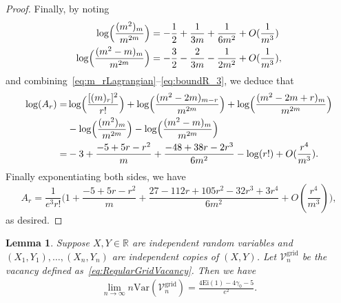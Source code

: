 \documentclass[11pt]{article}
\newtheorem{lemma}[thm]{Lemma}
\begin{document}
\begin{proof}
Finally, by noting 
\begin{align*}
\log\Bigl(\frac{(m^2)_m}{m^{2m}}\Bigr) & = -\frac{1}{2} + \frac{1}{3m} + \frac{1}{6m^2} + O(\frac{1}{m^3})\\ 
\log \Bigl(\frac{(m^2 -m)_{m}}{m^{2m}}\Bigr) &= -\frac{3}{2} - \frac{2}{3m} - \frac{1}{2m^2} + O(\frac{1}{m^3}),
\end{align*}
and combining~\eqref{eq:m_rLagrangian}--\eqref{eq:boundR_3}, we deduce that 
\begin{align*}
    \log(A_r) =& \log\Bigl(\frac{[(m)_r]^2}{r!}\Bigr)+\log\Bigl(\frac{(m^2 - 2m)_{m-r}}{m^{2m}}\Bigr) + \log \Bigl(\frac{(m^2 - 2m + r)_{m}}{m^{2m}}\Bigr)  \\
    &- \log\Bigl(\frac{(m^2)_m}{m^{2m}}\Bigr)-\log\Bigl(\frac{(m^2 -m)_{m}}{m^{2m}}\Bigr) \\
    =& -3 + \frac{-5 +5r - r^2}{m} + \frac{-48 +38r  -2r^3}{6m^2} - \log(r!) + O(\frac{r^4}{m^3}).
\end{align*}
Finally exponentiating both sides, we have 
\[ 
A_r = \frac{1}{e^3 r!}\bigl(1 + \frac{-5+5r-r^2}{m} + \frac{27-112r+105r^2-32r^3+3r^4}{6m^2}+O(\frac{r^4}{m^3}) \bigr),
\]
as desired.
\end{proof}

\begin{lemma}\label{lem:varVacancyReg}
Suppose $X, Y \in \mathbb{R}$ are independent random variables and $(X_1, Y_1), \ldots, (X_n, Y_n)$ are independent copies of $(X, Y)$. Let $\mathcal{V}_n^{\mathrm{grid}}$ be the vacancy defined as~\eqref{eq:RegularGridVacancy}. Then we have
\begin{align*}
    \lim_{n \to \infty} n \mathrm{Var}(\mathcal{V}_n^{\mathrm{grid}}) =  \frac{4 \mathrm{Ei}(1) - 4\gamma_0 - 5}{e^2}.
\end{align*}
\end{lemma}
\end{document}
